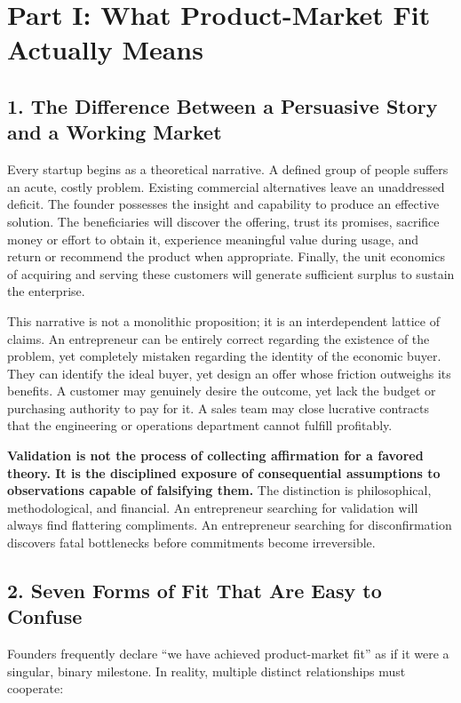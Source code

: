 \section*{Part I: What Product-Market Fit Actually Means}

\subsection*{1. The Difference Between a Persuasive Story and a Working Market}

Every startup begins as a theoretical narrative. A defined group of people suffers an acute, costly problem. Existing commercial alternatives leave an unaddressed deficit. The founder possesses the insight and capability to produce an effective solution. The beneficiaries will discover the offering, trust its promises, sacrifice money or effort to obtain it, experience meaningful value during usage, and return or recommend the product when appropriate. Finally, the unit economics of acquiring and serving these customers will generate sufficient surplus to sustain the enterprise.

This narrative is not a monolithic proposition; it is an interdependent lattice of claims. An entrepreneur can be entirely correct regarding the existence of the problem, yet completely mistaken regarding the identity of the economic buyer. They can identify the ideal buyer, yet design an offer whose friction outweighs its benefits. A customer may genuinely desire the outcome, yet lack the budget or purchasing authority to pay for it. A sales team may close lucrative contracts that the engineering or operations department cannot fulfill profitably.

\textbf{Validation is not the process of collecting affirmation for a favored theory. It is the disciplined exposure of consequential assumptions to observations capable of falsifying them.} The distinction is philosophical, methodological, and financial. An entrepreneur searching for validation will always find flattering compliments. An entrepreneur searching for disconfirmation discovers fatal bottlenecks before commitments become irreversible.

\subsection*{2. Seven Forms of Fit That Are Easy to Confuse}

Founders frequently declare ``we have achieved product-market fit'' as if it were a singular, binary milestone. In reality, multiple distinct relationships must cooperate:

